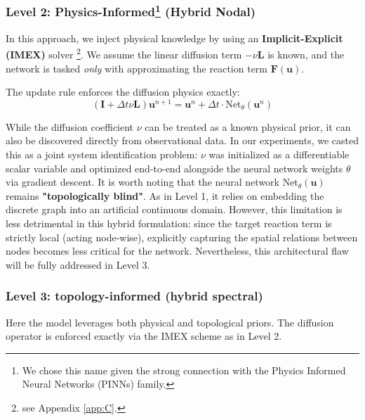 \subsubsection[Level 2: physics-informed (hybrid nodal)]{Level 2: Physics-Informed\footnote{We chose this name given the strong connection with the Physics Informed Neural Networks (PINNs) family.} (Hybrid Nodal)}
In this approach, we inject physical knowledge by using an \textbf{Implicit-Explicit (IMEX)} solver \footnote{see Appendix \ref{app:C}.}. We assume the linear diffusion term $-\nu \mathbf{L}$ is known, and the network is tasked \textit{only} with approximating the reaction term $\mathbf{F}(\mathbf{u})$.

The update rule enforces the diffusion physics exactly:
\begin{equation}
    (\mathbf{I} + \Delta t \nu \mathbf{L}) \mathbf{u}^{n+1} = \mathbf{u}^n + \Delta t \cdot \text{Net}_{\theta}(\mathbf{u}^n)
    \label{eq:imex_update}
\end{equation}


%

While the diffusion coefficient $\nu$ can be treated as a known physical prior, it can also be discovered directly from observational data. In our experiments, we casted this as a joint system identification problem: $\nu$ was initialized as a differentiable scalar variable and optimized end-to-end alongside the neural network weights $\theta$ via gradient descent.
It is worth noting that the neural network $\text{Net}_{\theta}(\mathbf{u})$ remains \textbf{"topologically blind"}. As in Level 1, it relies on embedding the discrete graph into an artificial continuous domain. However, this limitation is less detrimental in this hybrid formulation: since the target reaction term is strictly local (acting node-wise), explicitly capturing the spatial relations between nodes becomes less critical for the network. Nevertheless, this architectural flaw will be fully addressed in Level 3.

\subsubsection{Level 3: topology-informed (hybrid spectral)}
Here the model leverages both physical and topological priors.
The diffusion operator is enforced exactly via the IMEX scheme as in Level 2.

